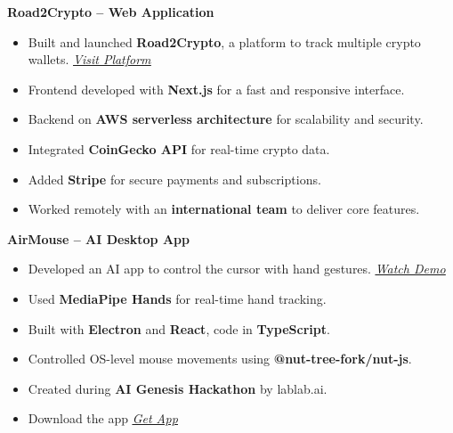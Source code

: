 \documentclass[a4paper,12pt]{article}
\begin{document}
\vspace{4pt} %
\textbf{Road2Crypto – Web Application}
\begin{itemize}
    \item Built and launched \textbf{Road2Crypto}, a platform to track multiple crypto wallets. 
    \hfill \textit{\href{https://road2crypto.com/assets?address=0x5d1d84d7d03016c505720e05f689cc49d77ebcb2}{\faLink \underline{Visit Platform}}}
    \item Frontend developed with \textbf{Next.js} for a fast and responsive interface.
    \item Backend on \textbf{AWS serverless architecture} for scalability and security.
    \item Integrated \textbf{CoinGecko API} for real-time crypto data.
    \item Added \textbf{Stripe} for secure payments and subscriptions.
    \item Worked remotely with an \textbf{international team} to deliver core features.
\end{itemize}

\vspace{6pt} %
\textbf{AirMouse – AI Desktop App}
\begin{itemize}
    \item Developed an AI app to control the cursor with hand gestures. 
    \hfill \textit{\href{https://www.linkedin.com/posts/aahmedfaraz_hackathon-ai-electron-activity-7397141415165726720-tlQq?utm_source=share&utm_medium=member_desktop&rcm=ACoAADdJH-cBzPnm9JIV3RhrpK_TvX28bFX_rEY}{\faLink \underline{Watch Demo}}}
    \item Used \textbf{MediaPipe Hands} for real-time hand tracking.
    \item Built with \textbf{Electron} and \textbf{React}, code in \textbf{TypeScript}.
    \item Controlled OS-level mouse movements using \textbf{@nut-tree-fork/nut-js}.
    \item Created during \textbf{AI Genesis Hackathon} by lablab.ai.
    \item Download the app \hfill \textit{\href{https://github.com/aahmedfaraz/air-mouse/releases/tag/v1.0.0}{\faLink \underline{Get App}}}
\end{itemize}

\end{document}
